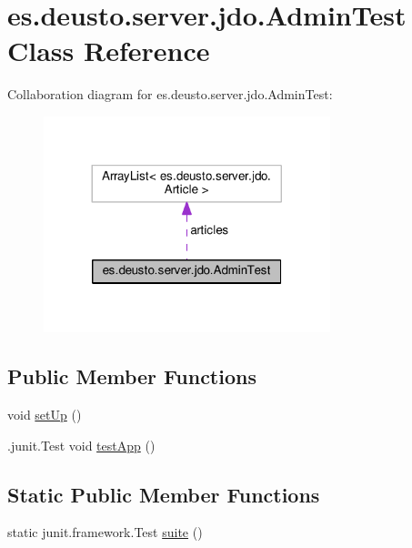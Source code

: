 \hypertarget{classes_1_1deusto_1_1server_1_1jdo_1_1_admin_test}{}\section{es.\+deusto.\+server.\+jdo.\+Admin\+Test Class Reference}
\label{classes_1_1deusto_1_1server_1_1jdo_1_1_admin_test}


Collaboration diagram for es.\+deusto.\+server.\+jdo.\+Admin\+Test\+:\nopagebreak
\begin{figure}[H]
\begin{center}
\leavevmode
\includegraphics[width=236pt]{classes_1_1deusto_1_1server_1_1jdo_1_1_admin_test__coll__graph}
\end{center}
\end{figure}
\subsection*{Public Member Functions}
\begin{DoxyCompactItemize}
\item 
void \hyperlink{classes_1_1deusto_1_1server_1_1jdo_1_1_admin_test_acaa555000602cd83a7e73550a7f114b4}{set\+Up} ()
\item 
.junit.\+Test void \hyperlink{classes_1_1deusto_1_1server_1_1jdo_1_1_admin_test_aba3d4e2c7110a3bc1c7557f4491e1691}{test\+App} ()
\end{DoxyCompactItemize}
\subsection*{Static Public Member Functions}
\begin{DoxyCompactItemize}
\item 
static junit.\+framework.\+Test \hyperlink{classes_1_1deusto_1_1server_1_1jdo_1_1_admin_test_aa2992f98029130ba303b2a7753d3c35d}{suite} ()
\end{DoxyCompactItemize}


